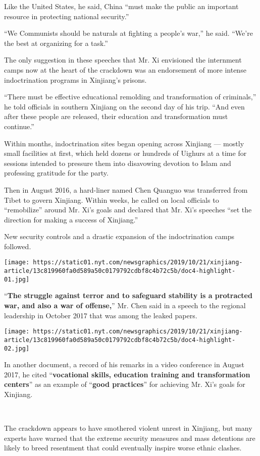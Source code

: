 Like the United States, he said, China ``must make the public an
important resource in protecting national security.''

``We Communists should be naturals at fighting a people's war,'' he
said. ``We're the best at organizing for a task.''

The only suggestion in these speeches that Mr. Xi envisioned the
internment camps now at the heart of the crackdown was an endorsement of
more intense indoctrination programs in Xinjiang's prisons.

``There must be effective educational remolding and transformation of
criminals,'' he told officials in southern Xinjiang on the second day of
his trip. ``And even after these people are released, their education
and transformation must continue.''

Within months, indoctrination sites began opening across Xinjiang ---
mostly small facilities at first, which held dozens or hundreds of
Uighurs at a time for sessions intended to pressure them into disavowing
devotion to Islam and professing gratitude for the party.

Then in August 2016, a hard-liner named Chen Quanguo was transferred
from Tibet to govern Xinjiang. Within weeks, he called on local
officials to ``remobilize'' around Mr. Xi's goals and declared that Mr.
Xi's speeches ``set the direction for making a success of Xinjiang.''

New security controls and a drastic expansion of the indoctrination
camps followed.

\texttt{[image: https://static01.nyt.com/newsgraphics/2019/10/21/xinjiang-article/13c819960fa0d589a50c0179792cdbf8c4b72c5b/doc4-highlight-01.jpg]}

``\textbf{The struggle against terror and to safeguard stability is a
protracted war, and also a war of offense,}'' Mr. Chen said in a speech
to the regional leadership in October 2017 that was among the leaked
papers.

\texttt{[image: https://static01.nyt.com/newsgraphics/2019/10/21/xinjiang-article/13c819960fa0d589a50c0179792cdbf8c4b72c5b/doc4-highlight-02.jpg]}

In another document, a record of his remarks in a video conference in
August 2017, he cited ``\textbf{vocational skills, education training
and transformation centers}'' as an example of ``\textbf{good
practices}'' for achieving Mr. Xi's goals for Xinjiang.

​

The crackdown appears to have smothered violent unrest in Xinjiang, but
many experts have warned that the extreme security measures and mass
detentions are likely to breed resentment that could eventually inspire
worse ethnic clashes.

